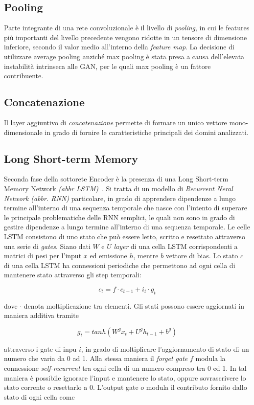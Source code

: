 \subsection{Pooling}
Parte integrante di una rete convoluzionale è il livello di \textit{pooling}, in cui le features più importanti del livello precedente vengono ridotte in un tensore di dimensione inferiore, secondo il valor medio all'interno della \textit{feature map}. La decisione di utilizzare average pooling anziché max pooling è stata presa a causa dell'elevata instabilità intrinseca alle GAN, per le quali max pooling è un fattore contribuente. 

\subsection{Concatenazione}
Il layer aggiuntivo di \textit{concatenazione} permette di formare un unico vettore mono-dimensionale in grado di fornire le caratteristiche principali dei domini analizzati.

\subsection{Long Short-term Memory}
Seconda fase della sottorete Encoder è la presenza di una Long Short-term Memory Network \textit{(abbr LSTM)}~\cite{LSTM}. Si tratta di un modello di \textit{Recurrent Neral Network (abbr. RNN)} particolare, in grado di apprendere dipendenze a lungo termine all'interno di una sequenza temporale che nasce con l'intento di superare le principale problematiche delle RNN semplici, le quali non sono in grado di gestire dipendenze a lungo termine all'interno di una sequenza temporale. Le celle LSTM consistono di uno stato che può essere letto, scritto e resettato attraverso una serie di \textit{gates}. Siano dati $W$ e $U$ \textit{layer} di una cella LSTM corrispondenti a matrici di pesi per l'input $x$ ed emissione $h$, mentre $b$ vettore di bias. Lo stato $c$ di una cella LSTM ha connessioni periodiche che permettono ad ogni cella di mantenere stato attraverso gli step temporali:

\[c_t = f \cdot c_{t-1} + i_t \cdot g_t\]

dove $\cdot$ denota moltiplicazione tra elementi. Gli stati possono essere aggiornati in maniera additiva tramite

\[g_t = tanh(W^gx_t + U^gh_{t-1}+b^g)\]


attraverso i gate di inpu $i$, in grado di moltiplicare l'aggiornamento di stato di un numero che varia da 0 ad 1. Alla stessa maniera il \textit{forget gate} $f$ modula la connessione \textit{self-recurrent} tra ogni cella di un numero compreso tra 0 ed 1. In tal maniera è possibile ignorare l'input e mantenere lo stato, oppure sovrascrivere lo stato corrente o resettarlo a 0.
L'output gate $o$ modula il contributo fornito dallo stato di ogni cella come

